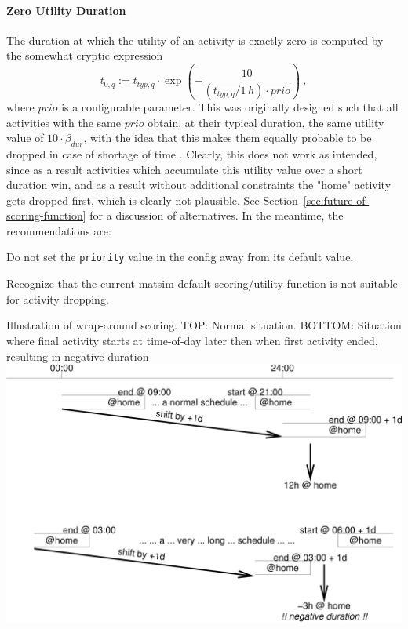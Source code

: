 \paragraph*{Zero Utility Duration}

The duration at which the utility of an activity is exactly zero is computed by the somewhat cryptic expression
\[
t_{0,q} := t_{typ,q} \cdot \exp\left( - \frac{10}{(t_{typ,q}/1\,h) \cdot prio} \right) \ ,
\]
where $prio$ is a configurable parameter. This was originally designed such that all activities with the same $prio$ obtain, at their typical duration, the same utility value of $10 \cdot \beta_{dur}$, with the idea that this makes them equally probable to be dropped in case of shortage of time \citep{CharyparNagel2005ga4acts}. Clearly, this does not work as intended, since as a result activities which accumulate this utility value over a short duration win, and as a result without additional constraints the "home" activity gets dropped first, which is clearly not plausible. See Section~\ref{sec:future-of-scoring-function} for a discussion of alternatives. In the meantime, the recommendations are:
\begin{compactitem}
\item Do not set the \lstinline$priority$ value in the config away from its default value.
\item Recognize that the current \gls{matsim} default scoring/utility function is not suitable for activity dropping.
\end{compactitem}


%
{Illustration of wrap-around scoring. TOP: Normal situation. BOTTOM: Situation where final activity starts at time-of-day later then when first activity ended, resulting in negative duration}%
{\label{tab:negative-durations}}%
{\includegraphics[width=0.8\hsize,trim=0 0 0 0,clip]{using/figures/negative-duration}}%
{}

